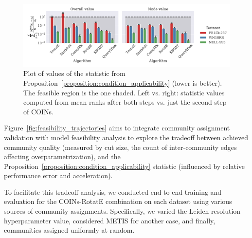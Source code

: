 \begin{figure}[H]
\begin{center}
\includegraphics[width=\linewidth]{figures/coins/feasibility_statistic}
\end{center}
\caption[Plot of the values of the COINs feasibility statistic.]{Plot of values of the statistic from Proposition~\ref{proposition:condition_applicability} (lower is better). The feasible region is the one shaded. Left vs. right: statistic values computed from mean ranks after both steps vs. just the second step of COINs.}
\label{fig:feasibility_statistic}
\end{figure}


Figure~\ref{fig:feasibility_trajectories} aims to integrate community assignment validation with model feasibility analysis to explore the tradeoff between achieved community quality (measured by cut size, the count of inter-community edges affecting overparametrization), and the Proposition~\ref{proposition:condition_applicability} statistic (influenced by relative performance error and acceleration). 

To facilitate this tradeoff analysis, we conducted end-to-end training and evaluation for the COINs-RotatE combination on each dataset using various sources of community assignments. Specifically, we varied the Leiden resolution hyperparameter value, considered METIS for another case, and finally, communities assigned uniformly at random.


